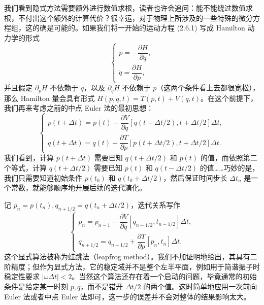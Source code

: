 我们看到隐式方法需要额外进行数值求根，读者也许会追问：能不能绕过数值求根，不付出这个额外的计算代价？很幸运，对于物理上所涉及的一些特殊的微分方程组，这的确是可能的。如果我们将一开始的运动方程 (2.6.1) 写成 Hamilton 动力学的形式
\begin{equation}
\begin{cases}
\dot p=-\dfrac{\partial H}{\partial q},\\
\dot q=\dfrac{\partial H}{\partial p},
\end{cases}
\tag{2.6.14}
\end{equation}
并且假定 $\partial_pH$ 不依赖于 $q$，以及 $\partial_qH$ 不依赖于 $p$（这两个条件看上去都很宽松），那么 Hamilton 量会具有形式 $H(p,q,t)=T(p,t)+V(q,t)$。在这个前提下，我们再来考虑之前的中点 Euler 法的最初思想：
\begin{equation}
\begin{cases}
p(t+\Delta t)=p(t)-\dfrac{\partial V}{\partial q}[q(t+\Delta t/2),t+\Delta t/2]\Delta t,\\[1ex]
q(t+\Delta t)=q(t)+\dfrac{\partial T}{\partial p}[p(t+\Delta t/2),t+\Delta t/2]\Delta t.
\end{cases}
\tag{2.6.15}
\end{equation}
我们看到，计算 $p(t+\Delta t)$ 需要已知 $q(t+\Delta t/2)$ 和 $p(t)$ 的值，而依照第二个等式，计算 $q(t+\Delta t/2)$ 需要已知 $p(t)$ 和 $q(t-\Delta t/2)$ 的值……巧妙的是，我们只需要知道初始条件 $p(t_0)$ 和 $q(t_0+\Delta t/2)$，然后保证时间步长 $\Delta t_n$ 是一个常数，就能够顺序地开展后续的迭代演化。

记 $p_n=p(t_n),q_{n+1/2}=q(t_n+\Delta t/2)$，迭代关系写作
\begin{equation}
\begin{cases}
p_n=p_{n-1}-\dfrac{\partial V}{\partial q}[q_{n-1/2},t_{n-1/2}]\Delta t,\\[1ex]
q_{n+1/2}=q_{n-1/2}+\dfrac{\partial T}{\partial p}[p_n,t_n]\Delta t.
\end{cases}
\tag{2.6.16}
\end{equation}
这个显式算法被称为蛙跳法（leapfrog method）。我们不加证明地给出，其具有二阶精度；但作为显式方法，它的稳定域并不是整个左半平面，例如用于简谐振子时稳定性要求 $|\omega\Delta t|<2$。当然这个算法还存在着一个启动的问题，毕竟通常的初始条件是给定某一时刻 $p,q$，而不是错开 $\Delta t/2$ 的两个值。这时简单地应用一次前向 Euler 法或者中点 Euler 法即可，这一步的误差并不会对整体的结果影响太大。

